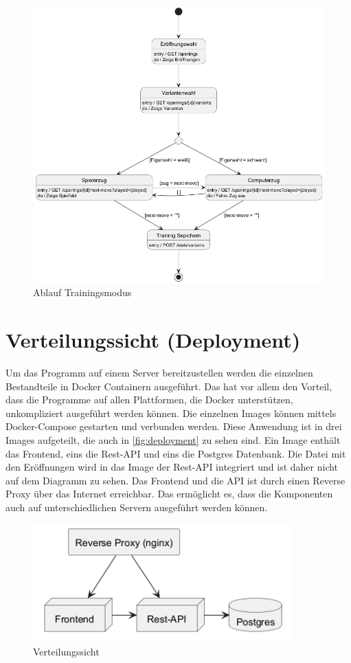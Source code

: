 \begin{figure}[h]
    \includegraphics[width=\linewidth]{images/diagrams/sd_training}
    \caption{Ablauf Trainingsmodus}
    \label{fig:sd_training}
\end{figure}

\clearpage

\section{Verteilungssicht (Deployment)}
Um das Programm auf einem Server bereitzustellen werden die einzelnen Bestandteile in Docker Containern ausgeführt. Das hat vor allem den Vorteil, dass die Programme auf allen Plattformen, die Docker unterstützen, unkompliziert ausgeführt werden können. Die einzelnen Images können mittels Docker-Compose gestarten und verbunden werden. Diese Anwendung ist in drei Images aufgeteilt, die auch in \autoref{fig:deployment} zu sehen sind. Ein Image enthält das Frontend, eins die Rest-API und eins die Postgres Datenbank. Die Datei mit den Eröffnungen wird in das Image der Rest-API integriert und ist daher nicht auf dem Diagramm zu sehen. Das Frontend und die API ist durch einen Reverse Proxy über das Internet erreichbar. Das ermöglicht es, dass die Komponenten auch auf unterschiedlichen Servern ausgeführt werden können.
 
\begin{figure}[h]
    \centering
    \includegraphics[width=10cm]{images/diagrams/deployment}
    \caption{Verteilungssicht}
    \label{fig:deployment}
\end{figure}

